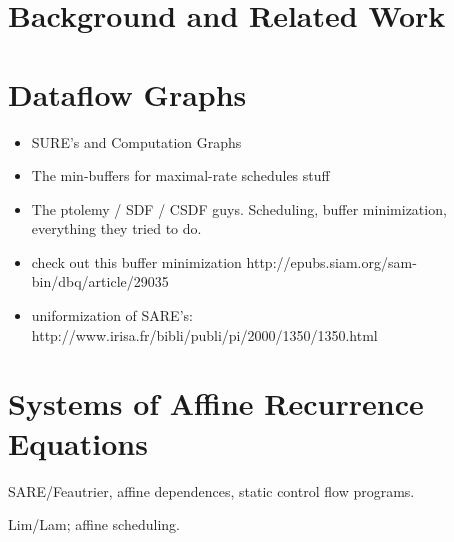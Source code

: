 \section{Background and Related Work}

\section{Dataflow Graphs}

\begin{itemize}

\item SURE's and Computation Graphs

\item The min-buffers for maximal-rate schedules stuff

\item The ptolemy / SDF / CSDF guys.  Scheduling, buffer minimization,
everything they tried to do.

\item  check out this buffer minimization 
  http://epubs.siam.org/sam-bin/dbq/article/29035

\item uniformization of SARE's:
  http://www.irisa.fr/bibli/publi/pi/2000/1350/1350.html

\end{itemize}

\section{Systems of Affine Recurrence Equations}

SARE/Feautrier, affine dependences, static control flow programs.

Lim/Lam; affine scheduling.

